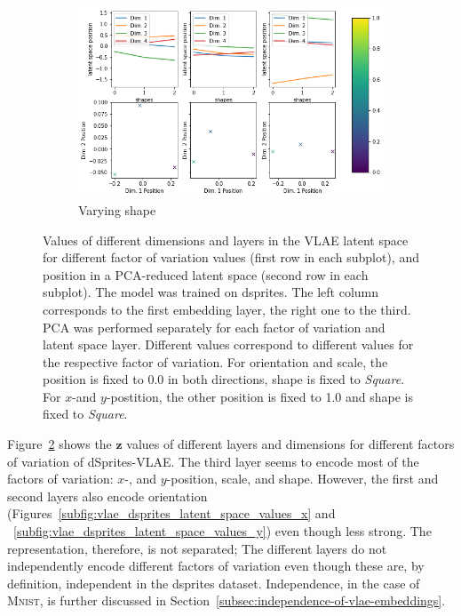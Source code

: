 \begin{figure}
\begin{subfigure}{.48\textwidth}
        \centering
        \includegraphics[width=\textwidth]{images/latent_space_traversals/vlae_dsprites_shape_latent_space_values.png}
        \caption{Varying shape}
        \label{subfig:vlae_dsprites_latent_space_values_shape}
    \end{subfigure}
    \caption[\ac{VLAE} on dsprites: Latent Space Values]{Values of different dimensions and layers in the \ac{VLAE} latent space for different factor of variation values (first row in each subplot), and position in a \ac{PCA}-reduced latent space (second row in each subplot). The model was trained on dsprites. The left column corresponds to the first embedding layer, the right one to the third. \ac{PCA} was performed separately for each factor of variation and latent space layer. Different values correspond to different values for the respective factor of variation. For orientation and scale, the position is fixed to 0.0 in both directions, shape is fixed to \textit{Square}. For $x$-and $y$-postition, the other position is fixed to 1.0 and shape is fixed to \textit{Square}.}
    \label{fig:vlae_dsprites_latent_space_values}
\end{figure}
Figure~\ref{fig:vlae_dsprites_latent_space_values} shows the $\bm{z}$ values of different layers and dimensions for different factors of variation of dSprites-\ac{VLAE}.
The third layer seems to encode most of the factors of variation: $x$-, and $y$-position, scale, and shape.
However, the first and second layers also encode orientation (Figures~\ref{subfig:vlae_dsprites_latent_space_values_x} and ~\ref{subfig:vlae_dsprites_latent_space_values_y}) even though less strong.
The representation, therefore, is not separated;
The different layers do not independently encode different factors of variation even though these are, by definition, independent in the dsprites dataset.
Independence, in the case of \textsc{Mnist}, is further discussed in Section~\ref{subsec:independence-of-vlae-embeddings}.

